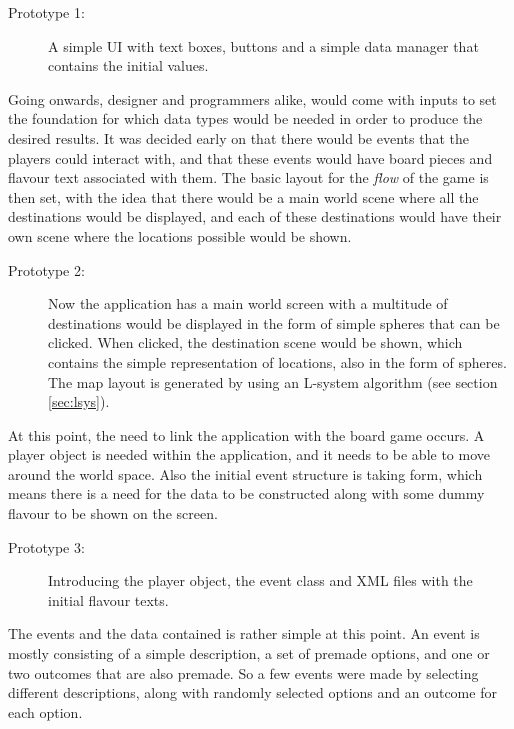 \begin{description}
\item[Prototype 1:] A simple UI with text boxes, buttons and a simple data manager that contains the initial values.
\end{description}

Going onwards, designer and programmers alike, would come with inputs to set the foundation for which data types would be needed in order to produce the desired results.
It was decided early on that there would be events that the players could interact with, and that these events would have board pieces and flavour text associated with them. The basic layout for the \textit{flow} of the game is then set, with the idea that there would be a main world scene where all the destinations would be displayed, and each of these destinations would have their own scene where the locations possible would be shown.

\begin{description}
\item[Prototype 2:] Now the application has a main world screen with a multitude of destinations would be displayed in the form of simple spheres that can be clicked. When clicked, the destination scene would be shown, which contains the simple representation of locations, also in the form of spheres.
The map layout is generated by using an L-system algorithm (see section \ref{sec:lsys}).
\end{description}

At this point, the need to link the application with the board game occurs. A player object is needed within the application, and it needs to be able to move around the world space. Also the initial event structure is taking form, which means there is a need for the data to be constructed along with some dummy flavour to be shown on the screen.

\begin{description}
\item[Prototype 3:] Introducing the player object, the event class and XML files with the initial flavour texts.
\end{description}

The events and the data contained is rather simple at this point. An event is mostly consisting of a simple description, a set of premade options, and one or two outcomes that are also premade. So a few events were made by selecting different descriptions, along with randomly selected options and an outcome for each option.

